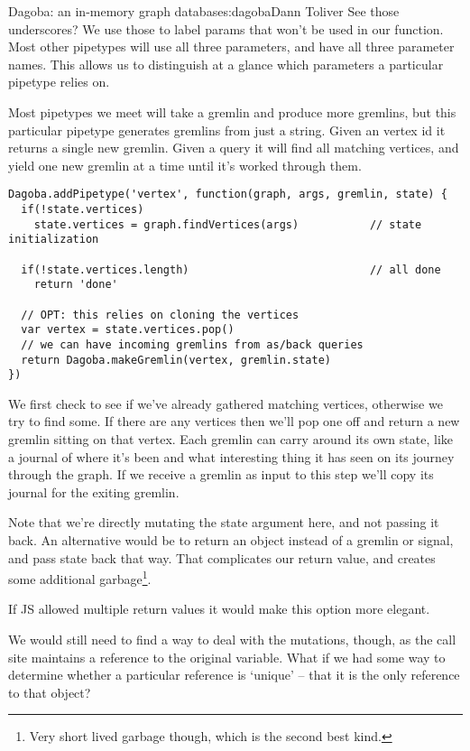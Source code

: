 \begin{aosachapter}{Dagoba: an in-memory graph database}{s:dagoba}{Dann Toliver}
See those underscores? We use those to label params that won't be used
in our function. Most other pipetypes will use all three parameters, and
have all three parameter names. This allows us to distinguish at a
glance which parameters a particular pipetype relies on.

\label{vertex}

Most pipetypes we meet will take a gremlin and produce more gremlins,
but this particular pipetype generates gremlins from just a string.
Given an vertex id it returns a single new gremlin. Given a query it
will find all matching vertices, and yield one new gremlin at a time
until it's worked through them.

\begin{verbatim}
Dagoba.addPipetype('vertex', function(graph, args, gremlin, state) {
  if(!state.vertices) 
    state.vertices = graph.findVertices(args)           // state initialization

  if(!state.vertices.length)                            // all done
    return 'done'
  
  // OPT: this relies on cloning the vertices
  var vertex = state.vertices.pop()                     
  // we can have incoming gremlins from as/back queries
  return Dagoba.makeGremlin(vertex, gremlin.state)      
})
\end{verbatim}

We first check to see if we've already gathered matching vertices,
otherwise we try to find some. If there are any vertices then we'll pop
one off and return a new gremlin sitting on that vertex. Each gremlin
can carry around its own state, like a journal of where it's been and
what interesting thing it has seen on its journey through the graph. If
we receive a gremlin as input to this step we'll copy its journal for
the exiting gremlin.

Note that we're directly mutating the state argument here, and not
passing it back. An alternative would be to return an object instead of
a gremlin or signal, and pass state back that way. That complicates our
return value, and creates some additional garbage\footnote{Very short
  lived garbage though, which is the second best kind.}.

If JS allowed multiple return values it would make this option more
elegant.

We would still need to find a way to deal with the mutations, though, as
the call site maintains a reference to the original variable. What if we
had some way to determine whether a particular reference is `unique' --
that it is the only reference to that object?


\end{aosachapter}
